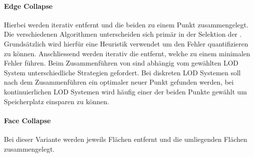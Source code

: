 \paragraph{Edge Collapse}
Hierbei werden iterativ  entfernt und die beiden  zu einem Punkt zusammengelegt.
Die verschiedenen Algorithmen unterscheiden sich primär in der Selektion der . Grundsätzlich wird hierfür eine Heuristik verwendet um den Fehler quantifizieren zu können. Anschliessend werden iterativ die  entfernt, welche zu einem minimalen Fehler führen. Beim Zusammenführen von  sind abhängig vom gewählten LOD System unterschiedliche Strategien gefordert. Bei diskreten LOD Systemen soll nach dem Zusammenführen ein optimaler neuer Punkt gefunden werden, bei kontinuierlichen LOD Systemen wird häufig einer der beiden Punkte gewählt um Speicherplatz einsparen zu können.

\paragraph{Face Collapse}
Bei dieser Variante werden jeweils Flächen entfernt und die umliegenden Flächen zusammengelegt.
